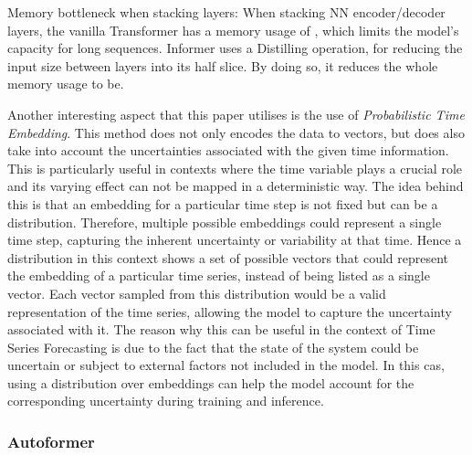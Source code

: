 \documentclass{article}
\begin{document}
    Memory bottleneck when stacking layers:
    When stacking NN encoder/decoder layers, the vanilla Transformer has a memory usage of , which limits the model's capacity for long sequences. Informer uses a Distilling operation, for reducing the input size between layers into its half slice. By doing so, it reduces the whole memory usage to be.

Another interesting aspect that this paper utilises is the use of \textit{Probabilistic Time Embedding}. This method does not only encodes the data to vectors, but does also take into account the uncertainties associated with the given time information. This is particularly useful in contexts where the time variable plays a crucial role and its varying effect can not be mapped in a deterministic way. The idea behind this is that an embedding for a particular time step is not fixed but can be a distribution. Therefore, multiple possible embeddings could represent a single time step, capturing the inherent uncertainty or variability at that time. Hence a distribution in this context shows a set of possible vectors that could represent the embedding of a particular time series, instead of being listed as a single vector. Each vector sampled from this distribution would be a valid representation of the time series, allowing the model to capture the uncertainty associated with it. The reason why this can be useful in the context of Time Series Forecasting is due to the fact that the state of the system could be uncertain or subject to external factors not included in the model. In this cas, using a distribution over embeddings can help the model account for the corresponding uncertainty during training and inference.

\subsubsection{Autoformer}

\cite{autoformer}




\newpage

\printbibliography
\end{document}
